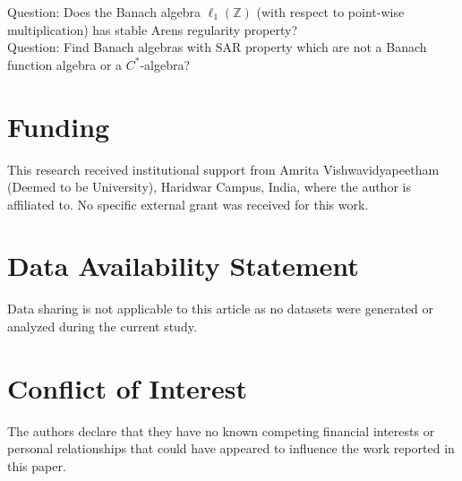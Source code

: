 \documentclass[pdflatex,sn-mathphys-num]{sn-jnl}%
\theoremstyle{thmstyleone}%
\theoremstyle{thmstyletwo}%
\theoremstyle{thmstylethree}%
\begin{document}
\noindent Question: Does the Banach algebra $\ell_1(\mathbb Z)$ (with respect to point-wise multiplication) has stable Arens regularity property?\\

\noindent Question: Find Banach algebras with SAR property which are not a Banach function algebra or a $C^*$-algebra?
\section*{Funding} 

This research received institutional support from Amrita Vishwavidyapeetham (Deemed to be University), Haridwar Campus, India, where the author is affiliated to. No specific external grant was received for this work.

\section*{Data Availability Statement}

Data sharing is not applicable to this article as no datasets were generated or analyzed during the current study.
\section*{Conflict of Interest}

The authors declare that they have no known competing financial interests or personal relationships that could have appeared to influence the work reported in this paper.
\end{document}
